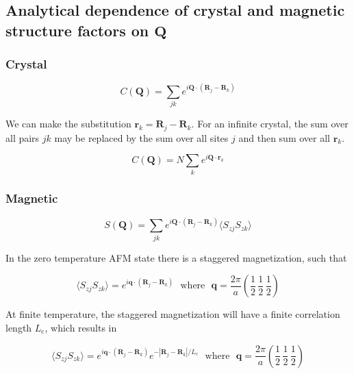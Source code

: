 \documentclass[11pt,letter]{article}
\newcommand{\bv}[1]{\ensuremath{\bm{#1}}}
\newcommand{\Lc}{\ensuremath{L_{\mathrm{c}}}}
\begin{document}
\subsection{ Analytical dependence of crystal and magnetic structure factors on \bv{Q}}

\subsubsection{Crystal}

\begin{equation}
C(\bv{Q}) = \sum_{jk} e^{i \bv{Q} \cdot (\bv{R}_{j} - \bv{R}_{k} )} 
\end{equation}

We can make the substitution $\bv{r}_{k} = \bv{R}_{j} -
\bv{R}_{k}$.  For an infinite crystal, the sum over all pairs $jk$ may be replaced by the sum over all
sites $j$ and then sum over all $\bv{r}_{k}$.
 
\begin{equation}
C(\bv{Q}) = N\sum_{k} e^{i \bv{Q} \cdot \bv{r}_{k}} 
\end{equation}

\subsubsection{Magnetic}

\begin{equation}
S(\bv{Q}) = \sum_{jk} e^{i \bv{Q} \cdot (\bv{R}_{j} - \bv{R}_{k} )} \langle S_{zj} S_{zk} \rangle
\end{equation}

In the zero temperature AFM state there is a staggered magnetization, such that 

\begin{equation}
\langle S_{zj}S_{zk} \rangle = e^{i \bv{q} \cdot (\bv{R}_{j} - \bv{R}_{k} )} 
\ \ \ \mathrm{where} \ \ \  
\bv{q} = \frac{2\pi}{a} \left( \frac{1}{2}\, \frac{1}{2}\, \frac{1}{2} \right)
\end{equation}

At finite temperature, the staggered magnetization will have a finite correlation length \Lc, which results in 

\begin{equation}
\langle S_{zj}S_{zk} \rangle = e^{i \bv{q} \cdot (\bv{R}_{j} - \bv{R}_{k} )} e^{-|\bv{R}_{j} -\bv{R}_{k} |/ \Lc }
 \ \ \ \mathrm{where} \ \ \   
\bv{q} = \frac{2\pi}{a} \left( \frac{1}{2}\, \frac{1}{2}\, \frac{1}{2} \right)
\end{equation}
\end{document}
